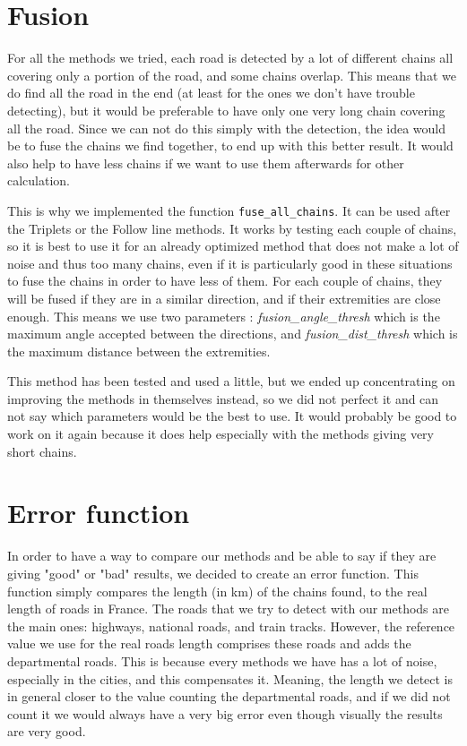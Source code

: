 \documentclass[main.tex]{subfiles}
\begin{document}
\section{Fusion}

For all the methods we tried, each road is detected by a lot of different chains all covering only a portion of the road, and some chains overlap. This means that we do find all the road in the end (at least for the ones we don't have trouble detecting), but it would be preferable to have only one very long chain covering all the road. Since we can not do this simply with the detection, the idea would be to fuse the chains we find together, to end up with this better result. It would also help to have less chains if we want to use them afterwards for other calculation.

This is why we implemented the function \texttt{fuse\_all\_chains}. It can be used after the Triplets or the Follow line methods. It works by testing each couple of chains, so it is best to use it for an already optimized method that does not make a lot of noise and thus too many chains, even if it is particularly good in these situations to fuse the chains in order to have less of them. For each couple of chains, they will be fused if they are in a similar direction, and if their extremities are close enough. This means we use two parameters : \textit{fusion\_angle\_thresh} which is the maximum angle accepted between the directions, and \textit{fusion\_dist\_thresh} which is the maximum distance between the extremities. 

This method has been tested and used a little, but we ended up concentrating on improving the methods in themselves instead, so we did not perfect it and can not say which parameters would be the best to use. It would probably be good to work on it again because it does help especially with the methods giving very short chains.


\section{Error function}

In order to have a way to compare our methods and be able to say if they are giving "good" or "bad" results, we decided to create an error function. This function simply compares the length (in km) of the chains found, to the real length of roads in France. The roads that we try to detect  with our methods are the main ones: highways, national roads, and train tracks. However, the reference value we use for the real roads length comprises these roads and adds the departmental roads. This is because every methods we have has a lot of noise, especially in the cities, and this compensates it. Meaning, the length we detect is in general closer to the value counting the departmental roads, and if we did not count it we would always have a very big error even though visually the results are very good. 
\end{document}
